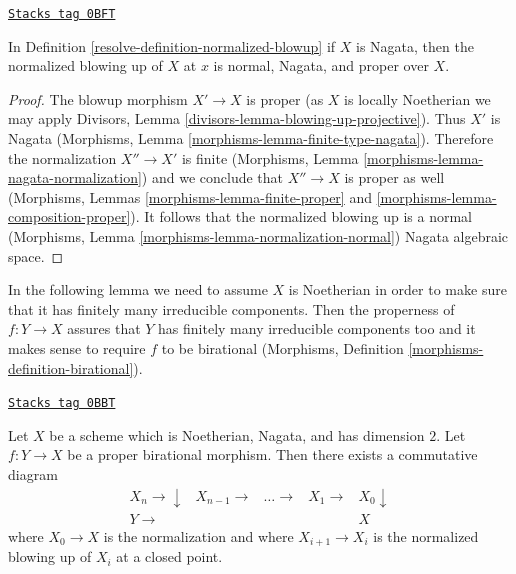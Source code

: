 \begin{lemma}
\label{resolve-lemma-Nagata-normalized-blowup}
\href{https://stacks.math.columbia.edu/tag/0BFT}{\texttt{Stacks tag 0BFT}}

In Definition \ref{resolve-definition-normalized-blowup} if $X$ is Nagata,
then the normalized blowing up of $X$ at $x$ is
normal, Nagata, and proper over $X$.
\end{lemma}

\begin{proof}
The blowup morphism $X' \to X$ is proper
(as $X$ is locally Noetherian we may apply
Divisors, Lemma \ref{divisors-lemma-blowing-up-projective}).
Thus $X'$ is Nagata
(Morphisms, Lemma \ref{morphisms-lemma-finite-type-nagata}).
Therefore the normalization $X'' \to X'$ is finite
(Morphisms, Lemma \ref{morphisms-lemma-nagata-normalization})
and we conclude that $X'' \to X$ is proper as well
(Morphisms, Lemmas \ref{morphisms-lemma-finite-proper} and
\ref{morphisms-lemma-composition-proper}).
It follows that the normalized blowing up
is a normal (Morphisms, Lemma
\ref{morphisms-lemma-normalization-normal})
Nagata algebraic space.
\end{proof}

In the following lemma we need to assume $X$ is Noetherian in order
to make sure that it has finitely many irreducible components.
Then the properness of $f : Y \to X$ assures that $Y$ has finitely
many irreducible components too and it makes sense to require
$f$ to be birational
(Morphisms, Definition \ref{morphisms-definition-birational}).

\begin{lemma}
\label{resolve-lemma-dominate-by-normalized-blowing-up}
\href{https://stacks.math.columbia.edu/tag/0BBT}{\texttt{Stacks tag 0BBT}}

Let $X$ be a scheme which is Noetherian, Nagata, and has dimension $2$.
Let $f : Y \to X$ be a proper birational morphism.
Then there exists a commutative diagram
$$
\begin{array}{ccccc}X_n \longrightarrow\downarrow & X_{n - 1} \longrightarrow & \ldots \longrightarrow & X_1 \longrightarrow & X_0 \downarrow \\ Y \longrightarrow &  &  &  & X\end{array}
$$
where $X_0 \to X$ is the normalization and
where $X_{i + 1} \to X_i$ is the normalized blowing up of $X_i$ at a closed
point.
\end{lemma}

